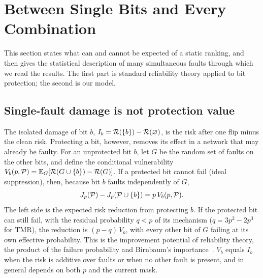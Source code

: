 \section{Between Single Bits and Every Combination}\label{sec:allocation}
This section states what can and cannot be expected of a static ranking, and then gives the statistical description of many simultaneous faults through which we read the results. The first part is standard reliability theory applied to bit protection; the second is our model.

\subsection{Single-fault damage is not protection value}
The isolated damage of bit $b$, $I_b=\mathcal{R}(\{b\})-\mathcal{R}(\varnothing)$, is the risk after one flip minus the clean risk. Protecting a bit, however, removes its effect in a network that may already be faulty. For an unprotected bit $b$, let $G$ be the random set of faults on the other bits, and define the conditional vulnerability $V_b(p,\mathcal{P})=\mathbb{E}_G[\mathcal{R}(G\cup\{b\})-\mathcal{R}(G)]$. If a protected bit cannot fail (ideal suppression), then, because bit $b$ faults independently of $G$,
\begin{equation}\label{eq:protection-benefit}
J_p(\mathcal{P})-J_p(\mathcal{P}\cup\{b\})=p\,V_b(p,\mathcal{P}).
\end{equation}
The left side is the expected risk reduction from protecting $b$. If the protected bit can still fail, with the residual probability $q<p$ of its mechanism ($q=3p^2-2p^3$ for TMR), the reduction is $(p-q)\,V_b$, with every other bit of $G$ failing at its own effective probability. This is the improvement potential of reliability theory, the product of the failure probability and Birnbaum's importance~\cite{birnbaum1969importance,rausand2004system}. $V_b$ equals $I_b$ when the risk is additive over faults or when no other fault is present, and in general depends on both $p$ and the current mask.

